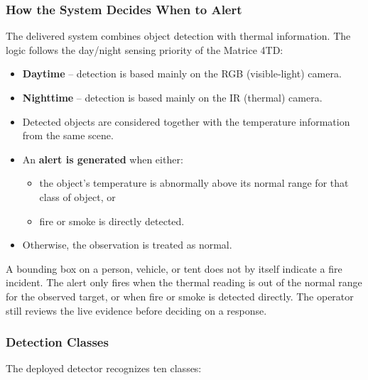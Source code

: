 \documentclass[11pt,letterpaper]{article}
\begin{document}
\subsubsection{How the System Decides When to Alert}

The delivered system combines object detection with thermal information. The
logic follows the day/night sensing priority of the Matrice 4TD:

\begin{itemize}[leftmargin=1.5em]
  \item \textbf{Daytime} -- detection is based mainly on the RGB (visible-light) camera.
  \item \textbf{Nighttime} -- detection is based mainly on the IR (thermal) camera.
  \item Detected objects are considered together with the temperature information
        from the same scene.
  \item An \textbf{alert is generated} when either:
    \begin{itemize}[leftmargin=1.2em]
      \item the object's temperature is abnormally above its normal range for
            that class of object, or
      \item fire or smoke is directly detected.
    \end{itemize}
  \item Otherwise, the observation is treated as normal.
\end{itemize}

\begin{infobox}
A bounding box on a person, vehicle, or tent does not by itself indicate a
fire incident. The alert only fires when the thermal reading is out of the
normal range for the observed target, or when fire or smoke is detected
directly. The operator still reviews the live evidence before deciding on a
response.
\end{infobox}

\subsubsection{Detection Classes}

The deployed detector recognizes ten classes:
\end{document}
